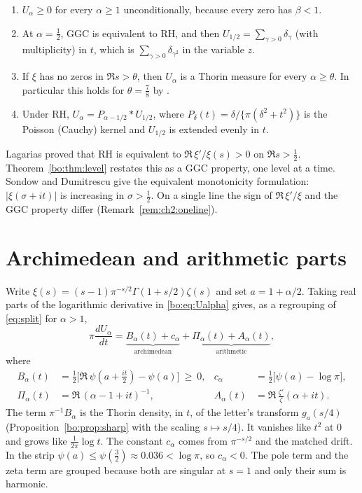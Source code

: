 \begin{corollary}\label{bo:cor:level}
\begin{enumerate}
\item $U_\alpha\ge0$ for every $\alpha\ge1$ unconditionally, because every zero has $\beta<1$.
\item At $\alpha=\frac12$, GGC is equivalent to RH, and then $U_{1/2}=\sum_{\gamma>0}\delta_\gamma$ (with multiplicity) in $t$, which is $\sum_{\gamma>0}\delta_{\gamma^2}$ in the variable $z$.
\item If $\xi$ has no zeros in $\Re s>\theta$, then $U_\alpha$ is a Thorin measure for every $\alpha\ge\theta$. In particular this holds for $\theta=\frac78$ by \cite{OAI26a}.
\item Under RH, $U_\alpha=P_{\alpha-1/2}*U_{1/2}$, where $P_\delta(t)=\delta/\{\pi(\delta^2+t^2)\}$ is the Poisson (Cauchy) kernel and $U_{1/2}$ is extended evenly in $t$.
\end{enumerate}
\end{corollary}

Lagarias \cite{Lagarias,Garunkstis02} proved that RH is equivalent to $\Re\,\xi'/\xi(s)>0$ on $\Re s>\frac12$. Theorem~\ref{bo:thm:level} restates this as a GGC property, one level at a time. Sondow and Dumitrescu \cite{SD10} give the equivalent monotonicity formulation: $|\xi(\sigma+it)|$ is increasing in $\sigma>\frac12$. On a single line the sign of $\Re\,\xi'/\xi$ and the GGC property differ (Remark~\ref{rem:ch2:oneline}).

\section{Archimedean and arithmetic parts}

Write $\xi(s)=(s-1)\pi^{-s/2}\Gamma(1+s/2)\zeta(s)$ and set $a=1+\alpha/2$. Taking real parts of the logarithmic derivative in \eqref{bo:eq:Ualpha} gives, as a regrouping of \eqref{eq:split} for $\alpha>1$,
\begin{equation}\label{bo:eq:split}
\pi\frac{dU_\alpha}{dt}=\underbrace{B_\alpha(t)+c_\alpha}_{\text{archimedean}}+\underbrace{\Pi_\alpha(t)+A_\alpha(t)}_{\text{arithmetic}},
\end{equation}
where
\begin{align*}
B_\alpha(t)&=\tfrac12\big[\Re\,\psi(a+\tfrac{it}2)-\psi(a)\big]\ \ge\ 0,&
c_\alpha&=\tfrac12\big[\psi(a)-\log\pi\big],\\
\Pi_\alpha(t)&=\Re\,(\alpha-1+it)^{-1},&
A_\alpha(t)&=\Re\,\tfrac{\zeta'}{\zeta}(\alpha+it).
\end{align*}
The term $\pi^{-1}B_\alpha$ is the Thorin density, in $t$, of the letter's transform $g_a(s/4)$ (Proposition~\ref{bo:prop:sharp} with the scaling $s\mapsto s/4$). It vanishes like $t^2$ at $0$ and grows like $\frac1{2\pi}\log t$. The constant $c_\alpha$ comes from $\pi^{-s/2}$ and the matched drift. In the strip $\psi(a)\le\psi(\frac32)\approx0.036<\log\pi$, so $c_\alpha<0$. The pole term and the zeta term are grouped because both are singular at $s=1$ and only their sum is harmonic.

